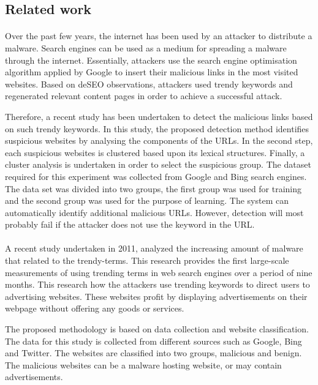 \subsection{Related work}

\paragraph{} 
Over the past few years, the internet has been used by an attacker to distribute a malware. Search engines can be used as a medium for spreading a malware through the internet. Essentially, attackers use the search engine optimisation algorithm applied by Google to insert their malicious links in the most visited websites. Based on deSEO observations, attackers used trendy keywords and regenerated relevant content pages in order to achieve a successful attack\cite{deseo}.

Therefore, a recent study has been undertaken to detect the malicious links based on such trendy keywords. In this study, the proposed detection method identifies suspicious websites by analysing the components of the URLs. In the second step, each suspicious websites is clustered based upon its lexical structures. Finally, a cluster analysis is undertaken in order to select the suspicious group\cite{deseo}.
The dataset required for this experiment was collected from Google and Bing search engines. The data set was divided into two groups, the first group was used for training and the second group was used for the purpose of learning. The system can automatically identify additional malicious URLs. However, detection will most probably fail if the attacker does not use the keyword in the URL\cite{deseo}.

\paragraph{} 
A recent study undertaken in 2011, analyzed the increasing amount of malware that related to the trendy-terms. This research provides the first large-scale measurements of using trending terms in web search engines over a period of nine months. This research how the attackers use trending keywords to direct users to advertising websites. These websites profit by displaying advertisements on their webpage without offering any goods or services\cite{moore2011fashion}.

The proposed methodology is based on data collection and website classification. The data for this study is collected from different sources such as Google, Bing and Twitter. The websites are classified into two groups, malicious and benign. The malicious websites can be a malware hosting website, or may contain advertisements\cite{moore2011fashion}.

